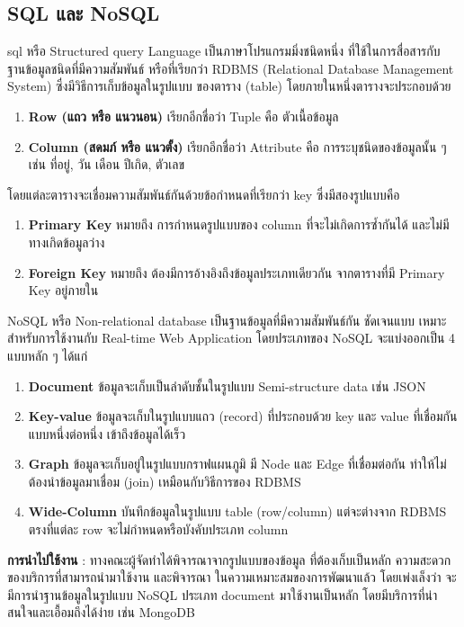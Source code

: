 \subsection{SQL และ NoSQL}
sql หรือ Structured query Language เป็นภาษาโปรแกรมมิ่งชนิดหนึ่ง 
ที่ใช้ในการสื่อสารกับ ฐานข้อมูลชนิดที่มีความสัมพันธ์ หรือที่เรียกว่า RDBMS 
(Relational Database Management System) ซึ่งมีวิธีการเก็บข้อมูลในรูปแบบ
ของตาราง (table) โดยภายในหนึ่งตารางจะประกอบด้วย
\begin{enumerate}
    \item \textbf{Row (แถว หรือ แนวนอน)} เรียกอีกชื่อว่า Tuple คือ 
    ตัวเนื้อข้อมูล
    \item \textbf{Column (สดมภ์ หรือ แนวตั้ง)} เรียกอีกชื่อว่า Attribute 
    คือ การระบุชนิดของข้อมูลนั้น ๆ เช่น ที่อยู่, วัน เดือน ปีเกิด, ตัวเลข
\end{enumerate}
\par โดยแต่ละตารางจะเชื่อมความสัมพันธ์กันด้วยข้อกำหนดที่เรียกว่า key 
ซึ่งมีสองรูปแบบคือ
\begin{enumerate}
    \item \textbf{Primary Key} หมายถึง การกำหนดรูปแบบของ column 
    ที่จะไม่เกิดการซ้ำกันได้ และไม่มีทางเกิดข้อมูลว่าง
    \item \textbf{Foreign Key} หมายถึง ต้องมีการอ้างอิงถึงข้อมูลประเภทเดียวกัน
    จากตารางที่มี Primary Key อยู่ภายใน
\end{enumerate}
\par NoSQL หรือ Non-relational database เป็นฐานข้อมูลที่มีความสัมพันธ์กัน
ชัดเจนแบบ เหมาะสำหรับการใช้งานกับ Real-time Web Application 
โดยประเภทของ NoSQL จะแบ่งออกเป็น 4 แบบหลัก ๆ ได้แก่
\begin{enumerate}
    \item \textbf{Document} ข้อมูลจะเก็บเป็นลำดับชั้นในรูปแบบ 
    Semi-structure data เช่น JSON
    \item \textbf{Key-value} ข้อมูลจะเก็บในรูปแบบแถว (record) ที่ประกอบด้วย 
    key และ value ที่เชื่อมกันแบบหนึ่งต่อหนึ่ง เข้าถึงข้อมูลได้เร็ว
    \item \textbf{Graph} ข้อมูลจะเก็บอยู่ในรูปแบบกราฟแผนภูมิ มี Node และ Edge 
    ที่เชื่อมต่อกัน ทำให้ไม่ต้องนำข้อมูลมาเชื่อม (join) เหมือนกับวิธีการของ RDBMS
    \item \textbf{Wide-Column} บันทึกข้อมูลในรูปแบบ table (row/column) 
    แต่จะต่างจาก RDBMS ตรงที่แต่ละ row จะไม่กำหนดหรือบังคับประเภท column
\end{enumerate}
\textbf{การนำไปใช้งาน} : ทางคณะผู้จัดทำได้พิจารณาจากรูปแบบของข้อมูล
ที่ต้องเก็บเป็นหลัก ความสะดวกของบริการที่สามารถนำมาใช้งาน และพิจารณา
ในความเหมาะสมของการพัฒนาแล้ว โดยเพ่งเล็งว่า จะมีการนำฐานข้อมูลในรูปแบบ NoSQL 
ประเภท document มาใช้งานเป็นหลัก โดยมีบริการที่น่าสนใจและเอื้อมถึงได้ง่าย 
เช่น MongoDB
